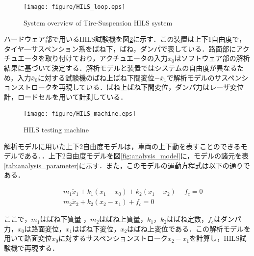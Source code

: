 \documentclass{article_vdlab_sotsuron_youshi}
\begin{document}
\vspace*{5mm}
\begin{figure}[H]
  \begin{center}
    \texttt{[image: figure/HILS\_loop.eps]}
    \vspace*{2mm}
    \caption{System overview of Tire-Suspension HILS system}
    \label{fig:HILS}
  \end{center}
\end{figure}

\newpage
ハードウェア部で用いるHILS試験機を図\ref{fig:testing_machine}に示す．この装置は上下1自由度で，タイヤ―サスペンション系をばね下，ばね，ダンパで表している．路面部にアクチュエータを取り付けており，アクチュエータの入力$\bar{x}_0$はソフトウェア部の解析結果に基づいて決定する．解析モデルと装置ではシステムの自由度が異なるため，入力$\bar{x}_0$に対する試験機のばね上ばね下間変位$-\bar{x}_1$で解析モデルのサスペンションストロークを再現している．ばね上ばね下間変位，ダンパ力はレーザ変位計，ロードセルを用いて計測している．

\vspace{5mm}
\begin{figure}[H]
 \centering
 \texttt{[image: figure/HILS\_machine.eps]}
 \vspace{-5mm}
  \caption{HILS testing machine}
 \label{fig:testing_machine}
\end{figure}

\vspace*{5mm}
解析モデルに用いた上下2自由度モデルは，車両の上下動を表すことのできるモデルである．\cite{2dof}．上下2自由度モデルを図\ref{fig:analysis_model}に，モデルの諸元を表\ref{tab:analysis_parameter}に示す．また，このモデルの運動方程式は以下の通りである．

\noindent
\begin{eqnarray}
 \label{eq:2dof_m1} &&m_1\ddot x_1 + k_1(x_1-x_0) + k_2(x_1-x_2) - f_c = 0\\
 \label{eq:2dof_m2} &&m_2\ddot x_2 + k_2(x_2-x_1) + f_c = 0
\end{eqnarray}

ここで，$m_1$はばね下質量 ，$m_2$はばね上質量，$k_1$，$k_2$はばね定数，$f_c$はダンパ力，$x_0$は路面変位，$x_1$はばね下変位，$x_2$はばね上変位である．この解析モデルを用いて路面変位$x_0$に対するサスペンションストローク$x_2-x_1$を計算し，HILS試験機で再現する．
\end{document}
